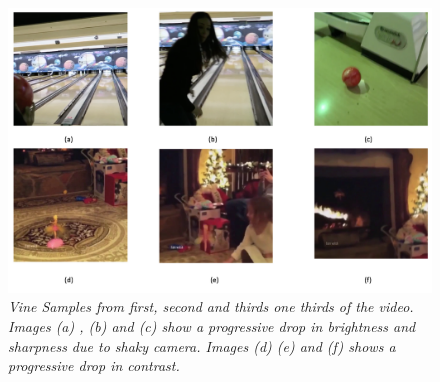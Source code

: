 \begin{figure}[!tbh]
\centering
\includegraphics[width=\columnwidth]{figures/Vine_samples2}
\caption{\textsl{ Vine Samples from first, second and thirds one thirds of the video. Images (a) , (b) and (c) show a progressive drop in brightness and sharpness due to shaky camera. Images (d) (e) and (f) shows a progressive drop in contrast.}}
\label{fig:Vine_samples}
\end{figure}
%
%
%
%





